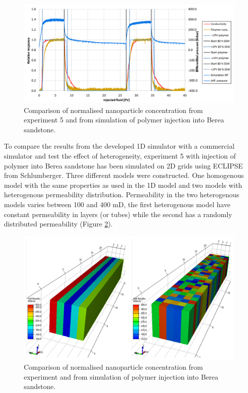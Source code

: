 \begin{figure}[h]
    \centering
    \includegraphics[width=\textwidth]{img/cht/simExpNP5.png}
    \caption{Comparison of normalised nanoparticle concentration from experiment 5 and from simulation of polymer injection into Berea sandstone.}
    \label{cht:simExpNP5}
\end{figure}

To compare the results from the developed 1D simulator with a commercial simulator and test the effect of heterogeneity, experiment 5 with injection of polymer into Berea sandstone has been simulated on 2D grids using ECLIPSE from Schlumberger. Three different models were constructed. One homogenous model with the same properties as used in the 1D model and two models with heterogenous permeability distribution. Permeability in the two heterogenous models varies between 100 and 400 mD, the first heterogenous model have constant permeability in layers (or tubes) while the second has a randomly distributed permeability (Figure \ref{cht:sim2dPerm}). 

\begin{figure}[h]
    \centering
    \includegraphics[width=\textwidth]{img/cht/sim2dPerm.png}
    \caption{Comparison of normalised nanoparticle concentration from experiment and from simulation of polymer injection into Berea sandstone.}
    \label{cht:sim2dPerm}
\end{figure}

